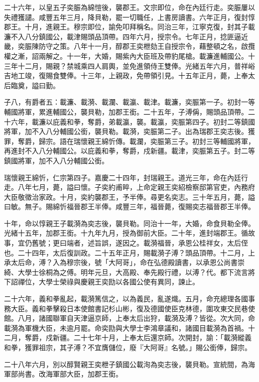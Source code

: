 \begin{pinyinscope}
二十六年，以皇五子奕脤為綿愷後，襲郡王。文宗即位，命在內廷行走。奕脤屢以失禮獲譴。咸豐五年三月，降貝勒，罷一切職任，上書房讀書。六年正月，復封惇郡王。十月，進親王。穆宗即位，諭免叩拜稱名。同治三年，江寧克復，封其子載濂不入八分鎮國公，載津賜頭品頂帶。四年六月，授宗令。七年正月，捻匪逼近畿，奕脤陳防守之策。八年十一月，醇郡王奕枻劾王自授宗令，藉整頓之名，啟攬權之漸，詔兩解之。十一年，大婚，賜紫內大臣班及帶豹尾槍。載濂進輔國公。十三年十二月，賜親？禁城乘四人肩輿，並免進領侍王雙俸。光緒五年六月，普祥峪吉地工竣，復賜食雙俸。十三年，上親政，免帶領引見。十五年正月，薨，上奉太后臨奠，謚曰勤。

子八，有爵者五：載濂、載漪、載瀾、載瀛、載津。載濂，奕脤第一子。初封一等輔國將軍，累進輔國公，襲貝勒，加郡王銜。二十五年，子溥偁，賜頭品頂帶。二十六年，載濂以庇義和拳，奪爵，弟載瀛，襲。載瀛，奕脤第四子。初封二等鎮國將軍，加不入八分輔國公銜，襲貝勒。載漪，奕脤第二子。出為瑞郡王奕志後。獲罪，奪爵，歸宗。語在瑞懷親王綿忻傳。載瀾，奕脤第三子。初封三等輔國將軍，再進封不入八分輔國公。以庇義和拳，奪爵，戍新疆。載津，奕脤第五子。封二等鎮國將軍，加不入八分輔國公銜。

瑞懷親王綿忻，仁宗第四子。嘉慶二十四年，封瑞親王。道光三年，命在內廷行走。八年七月，薨，謚曰懷。子奕約甫晬，上命定親王奕紹檢察邸第官吏，內務府大臣敬徵治家政。十月，奕約襲郡王，予半俸。尋更名奕志。三十年五月，薨，謚曰敏。無子。賜綿忻福晉郡王半俸。咸豐三年，福晉薨，復賜奕志福晉郡王半俸。

十年，命以惇親王子載漪為奕志後，襲貝勒。同治十一年，大婚，命食貝勒全俸。光緒十五年，加郡王銜。十九年九月，授為御前大臣。二十年，進封端郡王。循故事，宜仍舊號；更曰端者，述旨誤，遂因之。載漪福晉，承恩公桂祥女，太后侄也。二十四年，太后復訓政。二十五年正月，賜載漪子溥？頭品頂帶。十二月，上承太后命，溥？入為穆宗後，號「大阿哥」，命在弘德殿讀書，以承恩公尚書崇綺、大學士徐桐為之傅。明年元旦，大高殿、奉先殿行禮，以溥？代。都下流言將下詔禪位，大學士榮祿與慶親王奕劻以各國公使有異同，諫止。

二十六年，義和拳亂起，載漪篤信之，以為義民，亂遂熾。五月，命充總理各國事務大臣。義和拳擊殺日本使館書記杉山彬，復及德國使臣克林德，圍攻東交民巷使館。八月，諸國聯軍自天津逼京師，上奉太后出狩，載漪及溥？皆從。次大同，命載漪為軍機大臣，未逾月罷。命奕劻與大學士李鴻章議和，諸國目載漪為首禍。十二月，奪爵，戍新疆。二十七年十月，上奉太后還京師。次開封，諭：「載漪縱義和拳，獲罪祖宗，其子溥？不宜膺儲位，廢『大阿哥』名號。」賜公銜俸，歸宗。

二十八年六月，別以醇賢親王奕枻子鎮國公載洵為奕志後，襲貝勒。宣統間，為海軍部尚書。改海軍部大臣，加郡王銜。


\end{pinyinscope}

